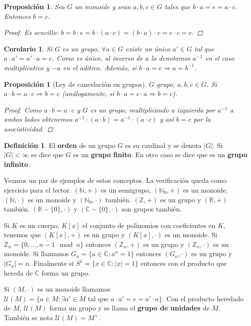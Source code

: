 \documentclass[12pt]{book}
\newtheorem{prop}[teo]{Proposición}
\newtheorem{cor}[teo]{Corolario}
\theoremstyle{definition}
\newtheorem{defn}[teo]{Definición}
\newcommand{\CC}{\mathbb{C}}
\newcommand{\RR}{\mathbb{R}}      %
\newcommand{\ZZ}{\mathbb{Z}}      %
\newcommand{\NN}{\mathbb{N}}
\begin{document}
\begin{prop}
Sea $G$ un monoide y sean $a,b,c\in G$ tales que $b\cdot a = e = a\cdot c$. Entonces $b=c$.
\begin{proof}
Es sencillo: $b=b\cdot e = b\cdot (a\cdot c) = (b\cdot a)\cdot c = e\cdot c = c$.
\end{proof}
\end{prop}
\begin{cor}
Si $G$ es un grupo, $\forall a\in G$ existe un \textit{único} $a'\in G$ tal que $a\cdot a' = a'\cdot a = e$. Como es único, al inverso de $a$ lo denotamos $a^{-1}$ en el caso multiplicativo y $-a$ en el aditivo.
Además, si $b\cdot a = e \Longrightarrow a=b^{-1}$.
\end{cor}

\begin{prop}[Ley de cancelación en grupos] $G$ grupo, $a,b,c\in G$. Si $a\cdot b = a\cdot c \Longrightarrow b=c$ (análogamente, si $b\cdot a = c\cdot a \Longrightarrow b=c$).
\begin{proof}
Como $a\cdot b=a\cdot c$ y $G$ es un grupo, multiplicando a izquierda por $a^{-1}$ a ambos lados obtenemos $a^{-1}\cdot (a\cdot b) = a^{-1}\cdot (a\cdot c)$ y así $b=c$ por la asociatividad.
\end{proof}
\end{prop}

\begin{defn}
El \textbf{orden} de un grupo $G$ es su cardinal y se denota $|G|$. Si $|G|<\infty$ se dice que $G$ es un \textbf{grupo finito}. En otro caso se dice que es un \textbf{grupo infinito}.
\end{defn}

Veamos un par de ejemplos de estos conceptos. La verificación queda como ejercicio para el lector. $(\NN,+)$ es un semigrupo, $(\NN_0,+)$ es un monoide, $(\NN,\cdot)$ es un monoide y $(\NN_0,\cdot)$ también. $(\ZZ,+)$ es un grupo y $(\RR,+)$ también. $(\RR - \{0\},\cdot)$ y $(\CC - \{0\},\cdot)$ son grupos también.

Si $K$ es un cuerpo, $K[x]$ el conjunto de polinomios con coeficientes en $K$, tenemos que $(K[x],+)$ es un grupo y $(K[x],\cdot)$ es un monoide. Si $\ZZ_n = \{\overline{0},\ldots , \overline{n-1} \mod{n} \}$ entonces $(\ZZ_n ,+)$ es un grupo y $(\ZZ_n,\cdot)$ es un monoide. Si llamamos $G_n=\{a\in \CC :a^n = 1 \}$ entonces $(G_n,\cdot)$ es un grupo y $|G_n|=n$. Finalmente si $S^1 = \{x\in\CC : |x|=1\}$ entonces con el producto que hereda de $\CC$ forma un grupo.

Si $(M,\cdot)$ es un monoide llamamos $\mathcal{U}(M) = \{a\in M : \exists a'\in M \text{ tal que } a\cdot a' = e = a'\cdot a\}$. Con el producto heredado de $M$, $\mathcal{U}(M)$ forma un grupo y se llama el \textbf{grupo de unidades} de $M$. También se nota $\mathcal{U}(M) = M^\times$.
\end{document}
